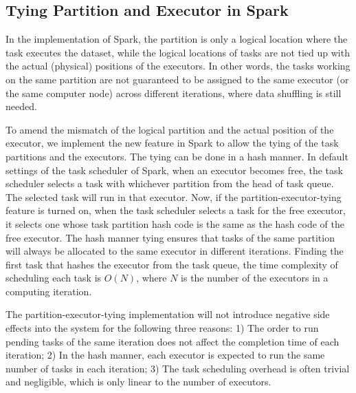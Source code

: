 \documentclass[10pt,journal,compsoc]{IEEEtran}
\begin{document}
\subsection{Tying Partition and Executor in Spark}
In the implementation of Spark, the partition is only a logical location where the task executes the dataset, while the logical locations of tasks are not tied up with the actual (physical) positions of the executors. 
In other words, %
the tasks working on the same partition are not guaranteed to be assigned to the same executor (or the same computer node) across different iterations, where data shuffling is still needed. 

To amend the mismatch of the logical partition and the actual position of the executor, we implement the new feature in Spark to allow the tying of the task partitions and the executors. 
The tying can be done in a hash manner. 
In default settings of the task scheduler of Spark, when an executor becomes free, the task scheduler selects a task with whichever partition from the head of task queue. The selected task will run in that executor. 
Now, if the partition-executor-tying feature is turned on, when the task scheduler selects a task for the free executor, 
it selects one whose task partition hash code is the same as the hash code of the free executor. 
The hash manner tying ensures that tasks of the same partition will always be allocated to the same executor in different iterations. 
Finding the first task that hashes the executor from the task queue, 
the time complexity of scheduling each task is $O(N)$, 
where $N$ is the number of the executors in a computing iteration. 

The partition-executor-tying implementation will not introduce negative side effects into the system for the following three reasons: 1)  The order to run pending tasks of the same iteration does not affect the completion time of each iteration; 2) In the hash manner, each executor is expected to run the same number of tasks in each iteration;
3) The task scheduling overhead is often trivial and negligible, which is only linear to the number of executors. 
\end{document}
